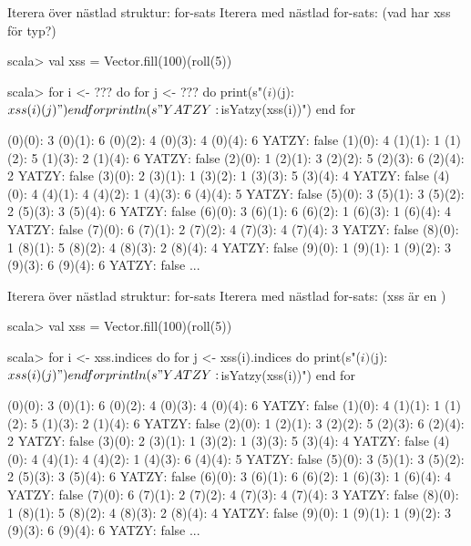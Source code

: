 \begin{Slide}{Iterera över nästlad struktur: for-sats}\SlideFontSmall
Iterera med nästlad for-sats: (vad har xss för typ?)
\begin{REPL}
scala> val xss = Vector.fill(100)(roll(5))

scala> for i <- ??? do 
         for j <- ??? do 
           print(s"($i)($j): ${xss(i)(j)} ")
         end for
         println(s" YATZY: ${isYatzy(xss(i))}")
       end for

(0)(0): 3 (0)(1): 6 (0)(2): 4 (0)(3): 4 (0)(4): 6  YATZY: false
(1)(0): 4 (1)(1): 1 (1)(2): 5 (1)(3): 2 (1)(4): 6  YATZY: false
(2)(0): 1 (2)(1): 3 (2)(2): 5 (2)(3): 6 (2)(4): 2  YATZY: false
(3)(0): 2 (3)(1): 1 (3)(2): 1 (3)(3): 5 (3)(4): 4  YATZY: false
(4)(0): 4 (4)(1): 4 (4)(2): 1 (4)(3): 6 (4)(4): 5  YATZY: false
(5)(0): 3 (5)(1): 3 (5)(2): 2 (5)(3): 3 (5)(4): 6  YATZY: false
(6)(0): 3 (6)(1): 6 (6)(2): 1 (6)(3): 1 (6)(4): 4  YATZY: false
(7)(0): 6 (7)(1): 2 (7)(2): 4 (7)(3): 4 (7)(4): 3  YATZY: false
(8)(0): 1 (8)(1): 5 (8)(2): 4 (8)(3): 2 (8)(4): 4  YATZY: false
(9)(0): 1 (9)(1): 1 (9)(2): 3 (9)(3): 6 (9)(4): 6  YATZY: false
...
\end{REPL}
\end{Slide}

\begin{Slide}{Iterera över nästlad struktur: for-sats}\SlideFontSmall
Iterera med nästlad for-sats: (xss är en )
\begin{REPL}
scala> val xss = Vector.fill(100)(roll(5))

scala> for i <- xss.indices do 
         for j <- xss(i).indices do
           print(s"($i)($j): ${xss(i)(j)} ")
         end for
         println(s" YATZY: ${isYatzy(xss(i))}")
       end for

(0)(0): 3 (0)(1): 6 (0)(2): 4 (0)(3): 4 (0)(4): 6  YATZY: false
(1)(0): 4 (1)(1): 1 (1)(2): 5 (1)(3): 2 (1)(4): 6  YATZY: false
(2)(0): 1 (2)(1): 3 (2)(2): 5 (2)(3): 6 (2)(4): 2  YATZY: false
(3)(0): 2 (3)(1): 1 (3)(2): 1 (3)(3): 5 (3)(4): 4  YATZY: false
(4)(0): 4 (4)(1): 4 (4)(2): 1 (4)(3): 6 (4)(4): 5  YATZY: false
(5)(0): 3 (5)(1): 3 (5)(2): 2 (5)(3): 3 (5)(4): 6  YATZY: false
(6)(0): 3 (6)(1): 6 (6)(2): 1 (6)(3): 1 (6)(4): 4  YATZY: false
(7)(0): 6 (7)(1): 2 (7)(2): 4 (7)(3): 4 (7)(4): 3  YATZY: false
(8)(0): 1 (8)(1): 5 (8)(2): 4 (8)(3): 2 (8)(4): 4  YATZY: false
(9)(0): 1 (9)(1): 1 (9)(2): 3 (9)(3): 6 (9)(4): 6  YATZY: false
...
\end{REPL}
\end{Slide}


